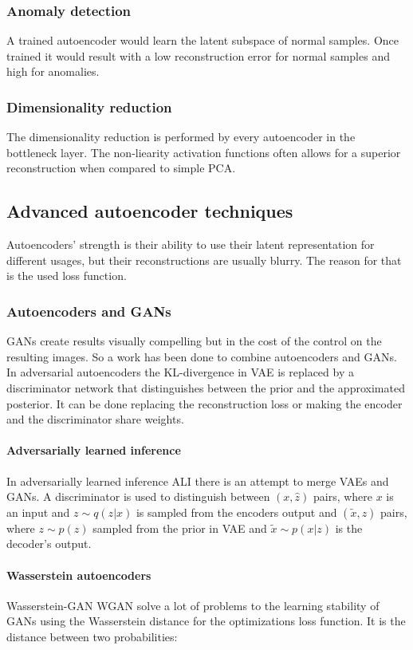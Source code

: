 		\subsubsection{Anomaly detection}
		A trained autoencoder would learn the latent subspace of normal samples.
		Once trained it would result with a low reconstruction error for normal samples and high for anomalies.

		\subsubsection{Dimensionality reduction}
		The dimensionality reduction is performed by every autoencoder in the bottleneck layer.
		The non-liearity activation functions often allows for a superior reconstruction when compared to simple PCA.

	\subsection{Advanced autoencoder techniques}
	Autoencoders' strength is their ability to use their latent representation for different usages, but their reconstructions are usually blurry.
	The reason for that is the used loss function.

		\subsubsection{Autoencoders and GANs}
		GANs create results visually compelling but in the cost of the control on the resulting images.
		So a work has been done to combine autoencoders and GANs.
		In adversarial autoencoders the KL-divergence in VAE is replaced by a discriminator network that distinguishes between the prior and the approximated posterior.
		It can be done replacing the reconstruction loss or making the encoder and the discriminator share weights.

			\paragraph{Adversarially learned inference}
			In adversarially learned inference ALI there is an attempt to merge VAEs and GANs.
			A discriminator is used to distinguish between $(x, \hat{z})$ pairs, where $x$ is an input and $z\sim q(z|x)$ is sampled from the encoders output and $(\tilde{x}, z)$ pairs, where $z\sim p(z)$ sampled from the prior in VAE and $\tilde{x}\sim p(x|z)$ is the decoder's output.

			\paragraph{Wasserstein autoencoders}
			Wasserstein-GAN WGAN solve a lot of problems to the learning stability of GANs using the Wasserstein distance for the optimizations loss function.
			It is the distance between two probabilities:

